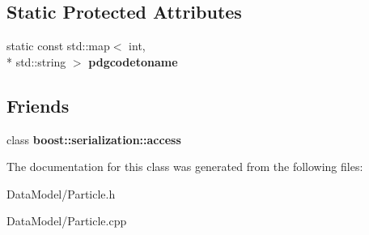 \subsection*{Static Protected Attributes}
\begin{DoxyCompactItemize}
\item 
\hypertarget{classParticle_aba2ffd81db8bd9a437958cb2505c01bb}{static const std\-::map$<$ int, \\*
std\-::string $>$ {\bfseries pdgcodetoname}}\label{classParticle_aba2ffd81db8bd9a437958cb2505c01bb}

\end{DoxyCompactItemize}
\subsection*{Friends}
\begin{DoxyCompactItemize}
\item 
\hypertarget{classParticle_ac98d07dd8f7b70e16ccb9a01abf56b9c}{class {\bfseries boost\-::serialization\-::access}}\label{classParticle_ac98d07dd8f7b70e16ccb9a01abf56b9c}

\end{DoxyCompactItemize}


The documentation for this class was generated from the following files\-:\begin{DoxyCompactItemize}
\item 
Data\-Model/Particle.\-h\item 
Data\-Model/Particle.\-cpp\end{DoxyCompactItemize}
